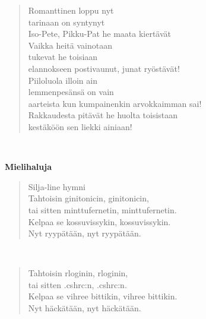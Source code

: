 \noindent\begin{minipage}{\linewidth}
\begin{verse}
	Romanttinen loppu nyt\\
	tarinaan on syntynyt\\
	Iso-Pete, Pikku-Pat he maata kiertävät\\
	Vaikka heitä vainotaan\\
	tukevat he toisiaan\\
	elannokseen postivaunut, junat ryöstävät!\\
	Piiloluola illoin ain\\
	lemmenpesänsä on vain\\
	aarteista kun kumpainenkin arvokkaimman sai!\\
	Rakkaudesta pitävät he huolta toisistaan\\
	kestäköön sen liekki ainiaan!\\
\end{verse}
\end{minipage}\\[10pt]
%
%
\noindent\begin{minipage}{\linewidth}
\vspace{5pt}
\parbox[t]{0.85\linewidth}{\raggedright {\large\bf Mielihaluja}\\[6pt]}
\begin{verse}
	Silja-line hymni\\
	Tahtoisin ginitonicin, ginitonicin,\\
	tai sitten minttufernetin, minttufernetin.\\
	Kelpaa se kossuvissykin, kossuvissykin.\\
	Nyt ryypätään, nyt ryypätään.\\
\end{verse}
\end{minipage}\\[10pt]
\noindent\begin{minipage}{\linewidth}
\begin{verse}
	Tahtoisin rloginin, rloginin,\\
	tai sitten .cshrc:n, .cshrc:n.\\
	Kelpaa se vihree bittikin, vihree bittikin.\\
	Nyt häckätään, nyt häckätään.\\
\end{verse}
\end{minipage}\\[10pt]
